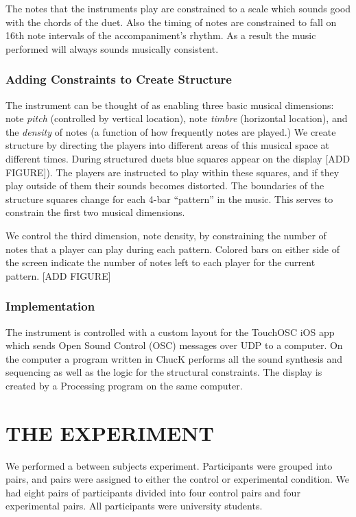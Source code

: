\documentclass{article}
\begin{document}
The notes that the instruments play are constrained to a scale which sounds good with the chords of the duet.  Also the timing of notes are constrained to fall on 16th note intervals of the accompaniment's rhythm.  As a result the music performed will always sounds musically consistent.

\subsubsection{Adding Constraints to Create Structure}

The instrument can be thought of as enabling three basic musical dimensions: note \emph{pitch} (controlled by vertical location), note \emph{timbre} (horizontal location), and the \emph{density} of notes (a function of how frequently notes are played.)  We create structure by directing the players into different areas of this musical space at different times. During structured duets blue squares appear on the display [ADD FIGURE]).  The players are instructed to play within these squares, and if they play outside of them their sounds becomes distorted.  The boundaries of the structure squares change for each 4-bar “pattern” in the music.  This serves to constrain the first two musical dimensions.

We control the third dimension, note density, by constraining the number of notes that a player can play during each pattern.  Colored bars on either side of the screen indicate the number of notes left to each player for the current pattern. [ADD FIGURE]

\subsubsection{Implementation}

The instrument is controlled with a custom layout for the TouchOSC iOS app which sends Open Sound Control (OSC) messages over UDP to a computer.  On the computer a program written in ChucK performs all the sound synthesis and sequencing as well as the logic for the structural constraints.  The display is created by a Processing program on the same computer.



\section{THE EXPERIMENT}
We performed a between subjects experiment.  Participants were grouped into pairs, and pairs were assigned to either the control or experimental condition.  We had eight pairs of participants divided into four control pairs and four experimental pairs. All participants were university students.
\end{document}
